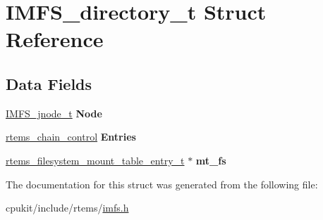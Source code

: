 \hypertarget{structIMFS__directory__t}{}\section{I\+M\+F\+S\+\_\+directory\+\_\+t Struct Reference}
\label{structIMFS__directory__t}
\subsection*{Data Fields}
\begin{DoxyCompactItemize}
\item 
\mbox{\label{structIMFS__directory__t_ad8a1931bedccbe6b90e978afaa124406}} 
\mbox{\hyperlink{structIMFS__jnode__tt}{I\+M\+F\+S\+\_\+jnode\+\_\+t}} {\bfseries Node}
\item 
\mbox{\label{structIMFS__directory__t_aab7d73bf2c0d073d7eb513d11db00dee}} 
\mbox{\hyperlink{unionChain__Control}{rtems\+\_\+chain\+\_\+control}} {\bfseries Entries}
\item 
\mbox{\label{structIMFS__directory__t_a15fad92faec3f3c4f800321ee45df8e1}} 
\mbox{\hyperlink{structrtems__filesystem__mount__table__entry__tt}{rtems\+\_\+filesystem\+\_\+mount\+\_\+table\+\_\+entry\+\_\+t}} $\ast$ {\bfseries mt\+\_\+fs}
\end{DoxyCompactItemize}


The documentation for this struct was generated from the following file\+:\begin{DoxyCompactItemize}
\item 
cpukit/include/rtems/\mbox{\hyperlink{imfs_8h}{imfs.\+h}}\end{DoxyCompactItemize}
